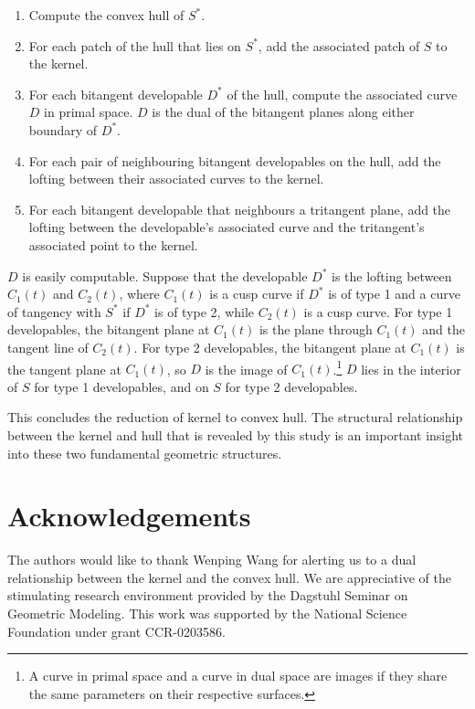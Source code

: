 \documentclass[doublespacing]{elsart}
\begin{document}
\begin{enumerate}
\item Compute the convex hull of $S^*$.
\item For each patch of the hull that lies on $S^*$, add the associated patch of $S$
	to the kernel.
\item For each bitangent developable $D^*$ of the hull, compute the associated curve $D$ in primal space.
	$D$ is the dual of the bitangent planes along either boundary of $D^*$.
\item For each pair of neighbouring bitangent developables on the hull,
	add the lofting between their associated curves to the kernel.
\item For each bitangent developable that neighbours a tritangent plane,
	add the lofting between the developable's associated curve and the tritangent's 
	associated point to the kernel.
\end{enumerate}

$D$ is easily computable.
Suppose that the developable $D^*$ is the lofting between $C_1(t)$ and $C_2(t)$,
where $C_1(t)$ is a cusp curve if $D^*$ is of type 1 and
a curve of tangency with $S^*$ if $D^*$ is of type 2,
while $C_2(t)$ is a cusp curve.
For type 1 developables, the bitangent plane at $C_1(t)$ is the plane through
$C_1(t)$ and the tangent line of $C_2(t)$.
For type 2 developables, the bitangent plane at $C_1(t)$ is the tangent plane
at $C_1(t)$, so $D$ is the image of $C_1(t)$.\footnote{A curve in primal
	space and a curve in dual space are images if they share the same
	parameters on their respective surfaces.}
$D$ lies in the interior of $S$ for type 1 developables,
and on $S$ for type 2 developables.

This concludes the reduction of kernel to convex hull.
The structural relationship between the kernel and hull that is revealed
by this study is an important insight into these two fundamental geometric structures.

\section{Acknowledgements}

The authors would like to thank Wenping Wang for alerting us
to a dual relationship between the kernel and the convex hull.
We are appreciative of the stimulating research environment
provided by the Dagstuhl Seminar on Geometric Modeling.
This work was supported by the National Science Foundation under 
grant CCR-0203586.
\end{document}
